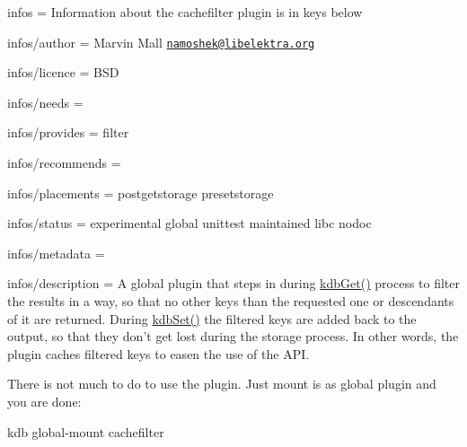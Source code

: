 
\begin{DoxyItemize}
\item infos = Information about the cachefilter plugin is in keys below
\item infos/author = Marvin Mall \href{mailto:namoshek@libelektra.org}{\tt namoshek@libelektra.\+org}
\item infos/licence = B\+S\+D
\item infos/needs =
\item infos/provides = filter
\item infos/recommends =
\item infos/placements = postgetstorage presetstorage
\item infos/status = experimental global unittest maintained libc nodoc
\item infos/metadata =
\item infos/description = A global plugin that steps in during \hyperlink{group__kdb_ga28e385fd9cb7ccfe0b2f1ed2f62453a1}{kdb\+Get()} process to filter the results in a way, so that no other keys than the requested one or descendants of it are returned. During \hyperlink{group__kdb_ga11436b058408f83d303ca5e996832bcf}{kdb\+Set()} the filtered keys are added back to the output, so that they don't get lost during the storage process. In other words, the plugin caches filtered keys to easen the use of the A\+P\+I.
\end{DoxyItemize}

There is not much to do to use the plugin. Just mount is as global plugin and you are done\+: \begin{DoxyVerb}kdb global-mount cachefilter\end{DoxyVerb}
 